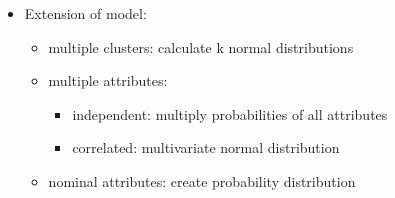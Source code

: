 \begin{itemize}
	\item Extension of model:
	\begin{itemize}
		\item multiple clusters: calculate k normal distributions
		\item multiple attributes: 
		\begin{itemize}
			\item independent: multiply probabilities of all attributes
			\item correlated: multivariate normal distribution
		\end{itemize}
		\item nominal attributes: create probability distribution
	\end{itemize}
\end{itemize}